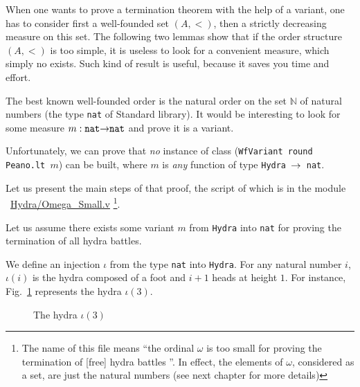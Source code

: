 When one wants to prove a termination theorem with the help of a variant, 
one has to consider first a well-founded set $(A,<)$, then a strictly decreasing measure on this set.  The following two lemmas show that if  the order structure $(A,<)$ is too simple, it is useless to look for a convenient measure, which simply no exists. Such kind of result is useful, because it saves you time and effort.


The best known well-founded order is the natural order on the set $\mathbb{N}$ of natural numbers (the type \texttt{nat} of Standard library). It would be interesting to look for some measure $m:\texttt{nat}\mbox{$\rightarrow$}\texttt{nat}$ and prove it is a variant.

Unfortunately, we can prove that 
\emph{no} instance of class (\texttt{WfVariant round Peano.lt $m$}) can be built, where
$m$ is \emph{any} function of type \texttt{Hydra $\mbox{$\rightarrow$}$ nat}.


Let us present the main steps of that proof, the script of which  is in the module ~\href{../theories/html/hydras.Hydra.Omega_Small.html}{Hydra/Omega\_Small.v} \footnote{ The name of this file means ``the ordinal $\omega$ is too small for proving the termination of [free] hydra battles ''. In effect, the elements of $\omega$, considered as a set, are just the natural numbers (see next chapter for more details)}.



Let us assume there exists some variant $m$ from \texttt{Hydra} into \texttt{nat} for proving
    the  termination of all hydra battles.


    
We define an injection $\iota$ from the type \texttt{nat} into \texttt{Hydra}.
For any natural number $i$, $\iota(i)$ is the hydra composed of a foot and
$i+1$ heads at height $1$. For instance, Fig.~\ref{fig:flower} represents the hydra $\iota(3)$.

\begin{figure}[htb]
\centering
{}
\caption{\label{fig:flower}
The hydra $\iota(3)$}
\end{figure}

